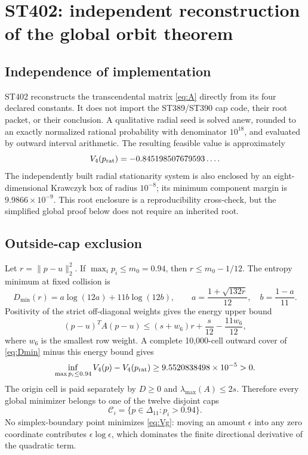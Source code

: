 \documentclass[11pt,a4paper]{article}
\begin{document}
\section{ST402: independent reconstruction of the global orbit theorem}

\subsection{Independence of implementation}

ST402 reconstructs the transcendental matrix \eqref{eq:A} directly from its four
declared constants.  It does not import the ST389/ST390 cap code, their root packet,
or their conclusion.  A qualitative radial seed is solved anew, rounded to an
exactly normalized rational probability with denominator $10^{18}$, and evaluated
by outward interval arithmetic.  The resulting feasible value is approximately
\[
 V_4(p_{\rm rat})=-0.845198507679593\ldots .
\]
The independently built radial stationarity system is also enclosed by an
eight-dimensional Krawczyk box of radius $10^{-8}$; its minimum component margin is
$9.9866\times10^{-9}$.  This root enclosure is a reproducibility cross-check, but
the simplified global proof below does not require an inherited root.

\subsection{Outside-cap exclusion}

Let $r=\lVert p-u\rVert_2^2$.  If $\max_i p_i\le m_0=0.94$, then
$r\le m_0-1/12$.  The entropy minimum at fixed collision is
\begin{equation}\label{eq:Dmin}
 D_{\min}(r)=a\log(12a)+11b\log(12b),\qquad
 a=\frac{1+\sqrt{132r}}{12},\quad b=\frac{1-a}{11}.
\end{equation}
Positivity of the strict off-diagonal weights gives the energy upper bound
\[
 (p-u)^TA(p-u)\le (s+w_6)r+\frac{s}{12}-\frac{11w_6}{12},
\]
where $w_6$ is the smallest row weight.  A complete 10,000-cell outward cover of
\eqref{eq:Dmin} minus this energy bound gives
\[
 \inf_{\max p_i\le0.94}V_4(p)-V_4(p_{\rm rat})
 \ge 9.5520838498\times10^{-5}>0.
\]
The origin cell is paid separately by $D\ge0$ and
$\lambda_{\max}(A)\le2s$.  Therefore every global minimizer belongs to one of the
twelve disjoint caps
\[
 \mathcal C_i=\{p\in\Delta_{11}:p_i>0.94\}.
\]
No simplex-boundary point minimizes \eqref{eq:Vg}: moving an amount $\epsilon$
into any zero coordinate contributes $\epsilon\log\epsilon$, which dominates the
finite directional derivative of the quadratic term.
\end{document}
